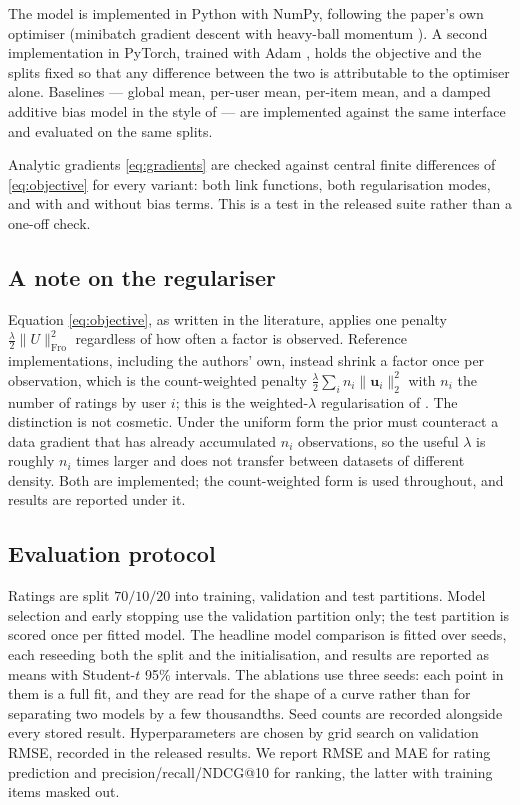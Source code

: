 \documentclass[conference]{IEEEtran}
\begin{document}
The model is implemented in Python with NumPy, following the paper's own optimiser
(minibatch gradient descent with heavy-ball momentum \cite{polyak1964some}). A second
implementation in PyTorch, trained with Adam \cite{kingma2015adam}, holds the objective
and the splits fixed so that any difference between the two is attributable to the
optimiser alone. Baselines --- global mean,
per-user mean, per-item mean, and a damped additive bias model in the style of
\cite{koren2008factorization} --- are implemented against the same interface and evaluated
on the same splits.

Analytic gradients \eqref{eq:gradients} are checked against central finite differences of
\eqref{eq:objective} for every variant: both link functions, both regularisation modes, and
with and without bias terms. This is a test in the released suite rather than a one-off
check.

\subsection{A note on the regulariser}

Equation \eqref{eq:objective}, as written in the literature, applies one penalty
$\tfrac{\lambda}{2}\lVert U\rVert_{\mathrm{Fro}}^2$ regardless of how often a factor is
observed. Reference implementations, including the authors' own, instead shrink a factor
once per observation, which is the count-weighted penalty $\tfrac{\lambda}{2}\sum_i n_i
\lVert\mathbf{u}_i\rVert_2^2$ with $n_i$ the number of ratings by user $i$; this is the
weighted-$\lambda$ regularisation of \cite{zhou2008large}. The distinction is not
cosmetic. Under the uniform form the prior must counteract a data gradient that has already
accumulated $n_i$ observations, so the useful $\lambda$ is roughly $n_i$ times larger and
does not transfer between datasets of different density. Both are implemented; the
count-weighted form is used throughout, and results are reported under it.

\subsection{Evaluation protocol}

Ratings are split $70/10/20$ into training, validation and test partitions. Model selection
and early stopping use the validation partition only; the test partition is scored once per
fitted model. The headline model comparison is fitted over \NumSeeds{} seeds, each reseeding both the
split and the initialisation, and results are reported as means with Student-$t$ 95\%
intervals. The ablations use three seeds: each point in them is a full fit, and they are
read for the shape of a curve rather than for separating two models by a few thousandths.
Seed counts are recorded alongside every stored result. Hyperparameters are chosen by grid search on validation RMSE, recorded in the
released results. We report RMSE and MAE for rating prediction and
precision/recall/NDCG@10 \cite{jarvelin2000ir} for ranking, the latter with
training items masked out.
\end{document}

